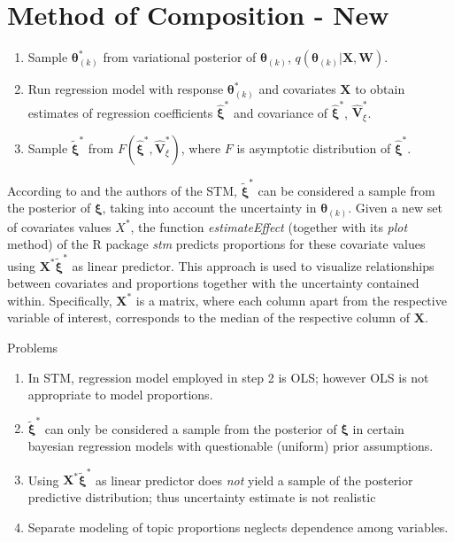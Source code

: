 \section{Method of Composition - New}

\begin{enumerate}
\item Sample $\boldsymbol{\theta}^*_{(k)}$ from variational posterior of $\boldsymbol{\theta}_{(k)}$, $q(\boldsymbol{\theta}_{(k)} | \boldsymbol{X}, \boldsymbol{W})$.
\item Run regression model with response $\boldsymbol{\theta}^*_{(k)}$ and covariates $\boldsymbol{X}$ to obtain estimates of regression coefficients $\hat{\boldsymbol{\xi}}^*$ and covariance of $\hat{\boldsymbol{\xi}}^*$, $\hat{\boldsymbol{V}}^*_{\xi}$.
\item Sample $\tilde{\boldsymbol{\xi}}^*$ from $F(\hat{\boldsymbol{\xi}}^*, \hat{\boldsymbol{V}}^*_{\xi})$, where $F$ is asymptotic distribution of $\hat{\boldsymbol{\xi}}^*$.
\end{enumerate}

According to \cite{treier2008democracy} and the authors of the STM, $\tilde{\boldsymbol{\xi}}^*$ can be considered a sample from the posterior of $\boldsymbol{\xi}$, taking into account the uncertainty in $\boldsymbol{\theta}_{(k)}$. Given a new set of covariates values $X^*$, the function \textit{estimateEffect} (together with its \textit{plot} method) of the R package \textit{stm} predicts proportions for these covariate values using $\boldsymbol{X}^*\tilde{\boldsymbol{\xi}}^*$ as linear predictor. This approach is used to visualize relationships between covariates and proportions together with the uncertainty contained within. Specifically, $\boldsymbol{X}^*$ is a matrix, where each column apart from the respective variable of interest, corresponds to the median of the respective column of $\boldsymbol{X}$.

Problems
\begin{enumerate}
\item In STM, regression model employed in step 2 is OLS; however OLS is not appropriate to model proportions.
\item $\tilde{\boldsymbol{\xi}}^*$ can only be considered a sample from the posterior of $\boldsymbol{\xi}$ in certain bayesian regression models with questionable (uniform) prior assumptions.
\item Using $\boldsymbol{X}^*\tilde{\boldsymbol{\xi}}^*$ as linear predictor does \textit{not} yield a sample of the posterior predictive distribution; thus uncertainty estimate is not realistic
\item Separate modeling of topic proportions neglects dependence among variables.
\end{enumerate}